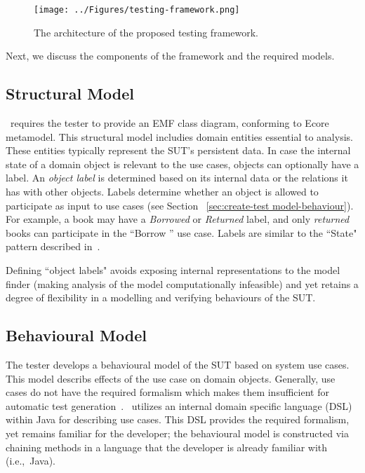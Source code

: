 \begin{figure*}[ht]
\centering
\texttt{[image: ../Figures/testing-framework.png]}
\caption{The architecture of the proposed testing framework.}
\label{fig:testing-framework}
\end{figure*}

Next, we discuss the components of the framework and the required models. 

\subsection{Structural Model}
\label{sec:framework-overview-structure}
\this~requires the tester to provide an EMF class diagram, conforming to Ecore metamodel.
This structural model includies domain entities essential to analysis. These entities typically represent the SUT's persistent data. 
In case the internal state of a domain object is relevant to the use cases, objects can optionally have a label.
An \textit{object label} is determined based on its internal data or the relations it has with other objects.
Labels determine whether an object is allowed to participate as input to use cases (see Section ~\ref{sec:create-test model-behaviour}). For example, a book may have a \textit{Borrowed} or \textit{Returned} label, and only \textit{returned} books can participate in the ``Borrow '' use case. Labels are similar to the ``State" pattern described in~\cite{Gamma1995}. 

Defining ``object labels" avoids exposing internal representations to the model finder (making analysis of the model computationally infeasible) and yet retains a degree of flexibility in a modelling and verifying behaviours of the SUT.

\subsection{Behavioural Model}
\label{sec:framework-overview-behaviour}
The tester develops a behavioural model of the SUT based on system use cases. This model describs effects of the use case on domain objects. Generally, use cases do not have the required formalism which makes them insufficient for automatic test generation~\cite{Beck2000}. \this~utilizes an internal domain specific language (DSL) within Java for describing use cases. This DSL provides the required formalism, yet remains familiar for the developer;  the behavioural model is constructed via chaining methods in a language that the developer is already familiar with (i.e.,\ Java).

